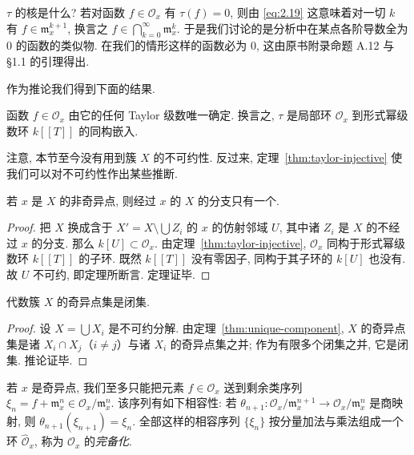 $\tau$ 的核是什么? 若对函数 $f \in \mathcal O_x$ 有 $\tau(f) = 0$, 则由 \eqref{eq:2.19} 这意味着对一切 $k$ 有 $f \in \mathfrak m_x^{k+1}$, 换言之 $f \in \bigcap_{k=0}^{\infty} \mathfrak m_x^k$. 于是我们讨论的是分析中在某点各阶导数全为 $0$ 的函数的类似物. 在我们的情形这样的函数必为 $0$, 这由原书附录命题 A.12 与 §1.1 的引理得出.

作为推论我们得到下面的结果.

\begin{theorem}\label{thm:taylor-injective}
	函数 $f \in \mathcal O_x$ 由它的任何 Taylor 级数唯一确定. 换言之, $\tau$ 是局部环 $\mathcal O_x$ 到形式幂级数环 $k[[T]]$ 的同构嵌入.
\end{theorem}

注意, 本节至今没有用到簇 $X$ 的不可约性. 反过来, 定理~\ref{thm:taylor-injective} 使我们可以对不可约性作出某些推断.

\begin{theorem}\label{thm:unique-component}
	若 $x$ 是 $X$ 的非奇异点, 则经过 $x$ 的 $X$ 的分支只有一个.
\end{theorem}

\begin{proof}
	把 $X$ 换成含于 $X' = X \setminus \bigcup Z_i$ 的 $x$ 的仿射邻域 $U$, 其中诸 $Z_i$ 是 $X$ 的不经过 $x$ 的分支. 那么 $k[U] \subset \mathcal O_x$. 由定理~\ref{thm:taylor-injective}, $\mathcal O_x$ 同构于形式幂级数环 $k[[T]]$ 的子环. 既然 $k[[T]]$ 没有零因子, 同构于其子环的 $k[U]$ 也没有. 故 $U$ 不可约, 即定理所断言. 定理证毕.
\end{proof}

\begin{corollary}\label{cor:singular-closed}
	代数簇 $X$ 的奇异点集是闭集.
\end{corollary}

\begin{proof}
	设 $X = \bigcup X_i$ 是不可约分解. 由定理~\ref{thm:unique-component}, $X$ 的奇异点集是诸 $X_i \cap X_j$（$i \ne j$）与诸 $X_i$ 的奇异点集之并; 作为有限多个闭集之并, 它是闭集. 推论证毕.
\end{proof}

若 $x$ 是奇异点, 我们至多只能把元素 $f \in \mathcal O_x$ 送到剩余类序列 $\xi_n = f + \mathfrak m_x^n \in \mathcal O_x/\mathfrak m_x^n$. 该序列有如下相容性: 若 $\theta_{n+1}: \mathcal O_x/\mathfrak m_x^{n+1} \to \mathcal O_x/\mathfrak m_x^n$ 是商映射, 则 $\theta_{n+1}(\xi_{n+1}) = \xi_n$. 全部这样的相容序列 $\{\xi_n\}$ 按分量加法与乘法组成一个环 $\widehat{\mathcal O}_x$, 称为 $\mathcal O_x$ 的\emph{完备化}.

